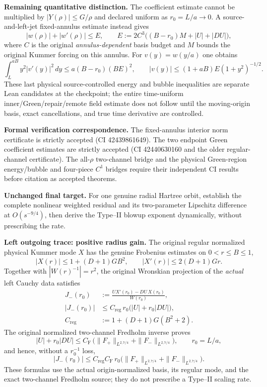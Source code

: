 \documentclass[11pt]{amsart}
\begin{document}
\medskip
\noindent\textbf{Remaining quantitative distinction.}
The coefficient estimate cannot be multiplied by $|Y(\rho)|\le G/\rho$
and declared uniform as $r_0=L/a\to0$.
A source-and-left-jet fixed-annulus estimate instead gives
\[
 |w(\rho)|+|w'(\rho)|
 \le E,\qquad
 E:=2C^3\bigl((B-r_0)M+\lvert U\rvert+\lvert DU\rvert\bigr),
\]
where $C$ is the original \emph{annulus-dependent} basis budget
and $M$ bounds the original Kummer forcing on this annulus.
For $v(y)=w(y/a)$ one obtains
\[
 \int_L^{aB}y^2\lvert v'(y)\rvert^2\,dy
 \le a(B-r_0)(BE)^2,\qquad
 |v(y)|\le (1+aB)E(1+y^2)^{-1/2}.
\]
These last physical source-controlled energy and bubble inequalities
are separate Lean candidates at the checkpoint; the entire time-uniform
inner/Green/repair/remote field estimate does not follow until
the moving-origin basis, exact cancellations, and true time derivative
are controlled.

\medskip
\noindent\textbf{Formal verification correspondence.}
The fixed-annulus interior norm certificate is strictly accepted
(CI 42439861649).  The two endpoint Green coefficient estimates
are strictly accepted (CI 42440630160 and the older regular-channel
certificate).  The all-$\rho$ two-channel bridge and the physical
Green-region energy/bubble and four-piece $C^1$ bridges require their
independent CI results before citation as accepted theorems.

\medskip
\noindent\textbf{Unchanged final target.}
For one genuine radial Hartree orbit, establish the complete nonlinear
weighted residual and its two-parameter Lipschitz difference at
$O(s^{-9/4})$, then derive the Type--II blowup exponent dynamically,
without prescribing the rate.

\medskip
\noindent\textbf{Left outgoing trace: positive radius gain.}
The original regular normalized physical Kummer mode $X$ has the genuine
Frobenius estimates on $0<r\le B\le 1$,
\[
 |X(r)|\le 1+(D+1)G B^2,\qquad
 |X'(r)|\le 2(D+1)Gr.
\]
Together with $|W(r)^{-1}|=r^2$, the original Wronskian projection
of the \emph{actual} left Cauchy data satisfies
\begin{align*}
 J_-(r_0)
  &:=\frac{U X'(r_0)-DU\,X(r_0)}{W(r_0)},\\
 |J_-(r_0)|
  &\le C_{\mathrm{reg}}\,r_0\bigl(|U|+r_0|DU|\bigr),\\
 C_{\mathrm{reg}}
  &:=1+(D+1)G(B^2+2).
\end{align*}
The original normalized two-channel Fredholm inverse proves
\[
 |U|+r_0|DU|
 \le C_{\mathrm{F}}\,
  \bigl(\|F_+\|_{L^{2,7/4}}+\|F_-\|_{L^{2,7/4}}\bigr),
 \qquad r_0=L/a,
\]
and hence, without a $r_0^{-1}$ loss,
\[
 |J_-(r_0)|\le C_{\mathrm{reg}}C_{\mathrm F}\,r_0
  \bigl(\|F_+\|_{L^{2,7/4}}+\|F_-\|_{L^{2,7/4}}\bigr).
\]
These formulas use the actual origin-normalized basis, its regular
mode, and the exact two-channel Fredholm source; they do not
prescribe a Type--II scaling rate.
\end{document}

